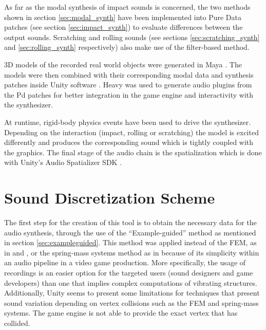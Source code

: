 As far as the modal synthesis of impact sounds is concerned, the two methods shown in section \ref{sec:modal_synth} have been implemented into Pure Data \cite{bib:pd} patches (see section \ref{sec:impact_synth}) to evaluate differences between the output sounds. Scratching and rolling sounds (see sections \ref{sec:scratching_synth} and \ref{sec:rolling_synth} respectively) also make use of the filter-based method.

3D models of the recorded real world objects were generated in Maya \cite{bib:maya}. The models were then combined with their corresponding modal data and synthesis patches inside Unity\textsuperscript{\textregistered} software \cite{bib:unity}. Heavy \cite{bib:heavy} was used to generate audio plugins from the \gls{Pd} patches for better integration in the game engine and interactivity with the synthesizer. 

At runtime, rigid-body physics events have been used to drive the synthesizer. Depending on the interaction (impact, rolling or scratching) the model is excited differently and produces the corresponding sound which is tightly coupled with the graphics. The final stage of the audio chain is the spatialization which is done with Unity\textsuperscript{\textregistered}'s Audio Spatializer \gls{SDK} \cite{bib:unity_doc}.

\section{Sound Discretization Scheme}\label{sec:discretization}

The first step for the creation of this tool is to obtain the necessary data for the audio synthesis, through the use of the ``Example-guided'' method as mentioned in section \ref{sec:exampleguided}. This method was applied instead of the \gls{FEM}, as in \cite{director2001synthesizing} and \cite{o2002synthesizing}, or the spring-mass systems method as in \cite{raghuvanshi2006interactive} because of its simplicity within an audio pipeline in a video game production. More specifically, the usage of recordings is an easier option for the targeted users (sound designers and game developers) than one that implies complex computations of vibrating structures. Additionally, Unity\textsuperscript{\textregistered} seems to present some limitations for techniques that present sound variation depending on vertex collisions such as the \gls{FEM} and spring-mass systems. The game engine is not able to provide the exact vertex that has collided. 

